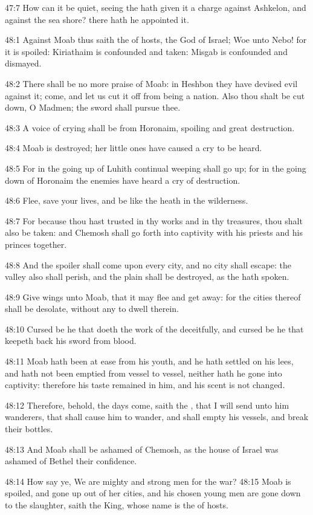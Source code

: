 47:7 How can it be quiet, seeing the \LORD hath given it a charge
against Ashkelon, and against the sea shore? there hath he appointed
it.

48:1 Against Moab thus saith the \LORD of hosts, the God of Israel; Woe
unto Nebo! for it is spoiled: Kiriathaim is confounded and taken:
Misgab is confounded and dismayed.

48:2 There shall be no more praise of Moab: in Heshbon they have
devised evil against it; come, and let us cut it off from being a
nation. Also thou shalt be cut down, O Madmen; the sword shall pursue
thee.

48:3 A voice of crying shall be from Horonaim, spoiling and great
destruction.

48:4 Moab is destroyed; her little ones have caused a cry to be heard.

48:5 For in the going up of Luhith continual weeping shall go up; for
in the going down of Horonaim the enemies have heard a cry of
destruction.

48:6 Flee, save your lives, and be like the heath in the wilderness.

48:7 For because thou hast trusted in thy works and in thy treasures,
thou shalt also be taken: and Chemosh shall go forth into captivity
with his priests and his princes together.

48:8 And the spoiler shall come upon every city, and no city shall
escape: the valley also shall perish, and the plain shall be
destroyed, as the \LORD hath spoken.

48:9 Give wings unto Moab, that it may flee and get away: for the
cities thereof shall be desolate, without any to dwell therein.

48:10 Cursed be he that doeth the work of the \LORD deceitfully, and
cursed be he that keepeth back his sword from blood.

48:11 Moab hath been at ease from his youth, and he hath settled on
his lees, and hath not been emptied from vessel to vessel, neither
hath he gone into captivity: therefore his taste remained in him, and
his scent is not changed.

48:12 Therefore, behold, the days come, saith the \LORD, that I will
send unto him wanderers, that shall cause him to wander, and shall
empty his vessels, and break their bottles.

48:13 And Moab shall be ashamed of Chemosh, as the house of Israel was
ashamed of Bethel their confidence.

48:14 How say ye, We are mighty and strong men for the war?  48:15
Moab is spoiled, and gone up out of her cities, and his chosen young
men are gone down to the slaughter, saith the King, whose name is the
\LORD of hosts.

